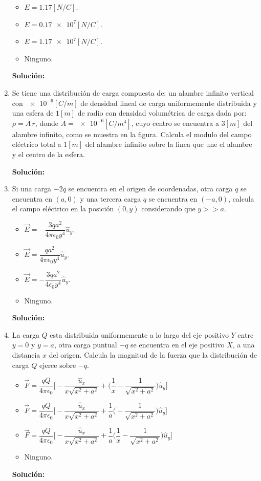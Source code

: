 \documentclass[letter,11pt]{article}
\begin{document}
\begin{enumerate}
\begin{itemize}
    \item $E=1.17[N/C]$.
    \item $E=\num{0.17e7}[N/C]$.
    \item $E=\num{1.17e7}[N/C]$.
    \item Ninguno.
\end{itemize}

\textbf{Solución:}

\item Se tiene una distribución de carga compuesta de: un alambre infinito
vertical con $\num{e-6}[C/m]$ de densidad lineal de carga uniformemente
distribuida y una esfera de $1[m]$ de radio con densidad volumétrica de carga
dada por: $\rho=A\,r$, donde $A=\num{e-6}[C/m^4]$, cuyo centro se encuentra a
$3[m]$ del alambre infinito, como se muestra en la figura. Calcula el modulo del
campo eléctrico total a $1[m]$ del alambre infinito sobre la linea que une el
alambre y el centro de la esfera.

\textbf{Solución:}

\item Si una carga $-2q$ se encuentra en el origen de coordenadas, otra carga
$q$ se encuentra en $(a,0)$ y una tercera carga $q$ se encuentra en $(-a,0)$,
calcula el campo eléctrico en la posición $(0,y)$ considerando que $y>>a$.

\begin{itemize}
    \item $\vec{E}=-\dfrac{3qa^2}{4\pi\epsilon_0 y^4}\hat{u}_y$.
    \item $\vec{E}=\dfrac{qa^2}{4\pi\epsilon_0 y^4}\hat{u}_y$.
    \item $\vec{E}=-\dfrac{3qa^2}{4\epsilon_0 y^4}\hat{u}_y$.
    \item Ninguno.
\end{itemize}

\textbf{Solución:}

\item La carga $Q$ esta distribuida uniformemente a lo largo del eje positivo
$Y$ entre $y=0$ y $y=a$, otra carga puntual $-q$ se encuentra en el eje positivo
$X$, a una distancia $x$ del origen. Calcula la magnitud de la fuerza que la
distribución de carga $Q$ ejerce sobre $-q$.

\begin{itemize}
    \item $\vec{F}=\dfrac{qQ}{4\pi\epsilon_0}\Biggr[-\dfrac{\hat{u}_x}{x\sqrt{x^2+a^2}}+\Biggr(\dfrac{1}{x}-\dfrac{1}{\sqrt{x^2+a^2}}\Biggr)\hat{u}_y\Biggr]$
    \item $\vec{F}=\dfrac{qQ}{4\pi\epsilon_0}\Biggr[-\dfrac{\hat{u}_x}{x\sqrt{x^2+a^2}}+\dfrac{1}{a}\Biggr(-\dfrac{1}{\sqrt{x^2+a^2}}\Biggr)\hat{u}_y\Biggr]$
    \item $\vec{F}=\dfrac{qQ}{4\pi\epsilon_0}\Biggr[-\dfrac{\hat{u}_x}{x\sqrt{x^2+a^2}}+\dfrac{1}{a}\Biggr(\dfrac{1}{x}-\dfrac{1}{\sqrt{x^2+a^2}}\Biggr)\hat{u}_y\Biggr]$
    \item Ninguno.
\end{itemize}

\textbf{Solución:}

\end{enumerate}
\end{document}
